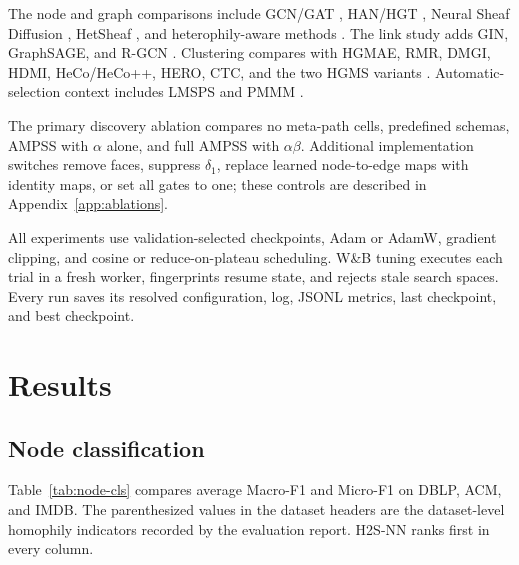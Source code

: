 \documentclass{article}
\newcommand{\method}{\textsc{H2S-NN}}
\newcommand{\ampss}{\textsc{AMPSS}}
\begin{document}
The node and graph comparisons include GCN/GAT \citep{kipf2017gcn,velickovic2018gat}, HAN/HGT
\citep{wang2019han,hu2020hgt}, Neural Sheaf Diffusion \citep{bodnar2022neural}, HetSheaf
\citep{braithwaite2024hetsheaf}, and heterophily-aware methods
\citep{guo2023hdhgr,lu2024h2sgnn,shen2024latgrl}. The link study adds GIN, GraphSAGE, and R-GCN
\citep{xu2019gin,hamilton2017sage,schlichtkrull2018rgcn}. Clustering compares with HGMAE, RMR,
DMGI, HDMI, HeCo/HeCo++, HERO, CTC, and the two HGMS variants \citep{wang2025hgms}.
Automatic-selection context includes LMSPS and PMMM \citep{yan2024lmsps,jiang2022pmmm}.

The primary discovery ablation compares no meta-path cells, predefined schemas, \ampss{} with
$\alpha$ alone, and full \ampss{} with $\alpha\beta$. Additional implementation switches remove
faces, suppress $\delta_1$, replace learned node-to-edge maps with identity maps, or set all gates
to one; these controls are described in Appendix~\ref{app:ablations}.

All experiments use validation-selected checkpoints, Adam or AdamW, gradient clipping, and cosine
or reduce-on-plateau scheduling. W\&B tuning executes each trial in a fresh worker, fingerprints
resume state, and rejects stale search spaces. Every run saves its resolved configuration, log,
JSONL metrics, last checkpoint, and best checkpoint.

\section{Results}
\label{sec:results}

\subsection{Node classification}

Table~\ref{tab:node-cls} compares average Macro-F1 and Micro-F1 on DBLP, ACM, and IMDB. The
parenthesized values in the dataset headers are the dataset-level homophily indicators recorded by
the evaluation report. \method{} ranks first in every column.
\end{document}
